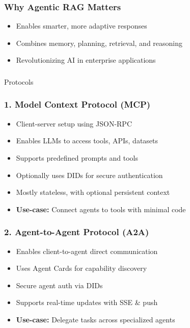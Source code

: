 \begin{frame}[fragile]\frametitle{Why Agentic RAG Matters}
    \begin{itemize}
        \item Enables smarter, more adaptive responses
        \item Combines memory, planning, retrieval, and reasoning
        \item Revolutionizing AI in enterprise applications
    \end{itemize}
\end{frame}

\begin{frame}[fragile]\frametitle{}
\begin{center}
{\Large Protocols}
\end{center}
\end{frame}

\begin{frame}[fragile]\frametitle{1. Model Context Protocol (MCP)}
      \begin{itemize}
        \item Client-server setup using JSON-RPC
        \item Enables LLMs to access tools, APIs, datasets
        \item Supports predefined prompts and tools
        \item Optionally uses DIDs for secure authentication
        \item Mostly stateless, with optional persistent context
        \item \textbf{Use-case:} Connect agents to tools with minimal code
      \end{itemize}
\end{frame}

\begin{frame}[fragile]\frametitle{2. Agent-to-Agent Protocol (A2A)}
      \begin{itemize}
        \item Enables client-to-agent direct communication
        \item Uses Agent Cards for capability discovery
        \item Secure agent auth via DIDs
        \item Supports real-time updates with SSE \& push
        \item \textbf{Use-case:} Delegate tasks across specialized agents
      \end{itemize}
\end{frame}


